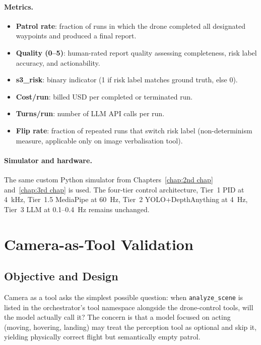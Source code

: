 \paragraph{Metrics.}
\begin{itemize}
  \item \textbf{Patrol rate}: fraction of runs in which the drone completed all designated waypoints and produced a final report.
  \item \textbf{Quality (0--5)}: human-rated report quality assessing completeness, risk label accuracy, and actionability.
  \item \textbf{s3\_risk}: binary indicator (1 if risk label matches ground truth, else 0).
  \item \textbf{Cost/run}: billed USD per completed or terminated run.
  \item \textbf{Turns/run}: number of LLM API calls per run.
  \item \textbf{Flip rate}: fraction of repeated runs that switch risk label (non-determinism measure, applicable only on image verbalisation tool).
\end{itemize}

\paragraph{Simulator and hardware.}
The same custom Python simulator from Chapters~\ref{chap:2nd chap} and~\ref{chap:3rd chap}
is used.  
The four-tier control architecture, Tier~1 PID at 4~kHz, Tier~1.5 MediaPipe at
60~Hz, Tier~2 YOLO+DepthAnything at 4~Hz, Tier~3 LLM at 0.1--0.4~Hz remains unchanged.

\section{Camera-as-Tool Validation}
\label{sec:ch4_nd1}

\subsection{Objective and Design}
\label{sec:ch4_nd1_design}

Camera as a tool asks the simplest possible question: when \texttt{analyze\_scene} is listed in the
orchestrator's tool namespace alongside the drone-control tools, will the model actually call
it?  
The concern is that a model focused on acting (moving, hovering, landing) may treat the perception tool as optional and skip it, yielding physically correct flight but semantically empty patrol.

